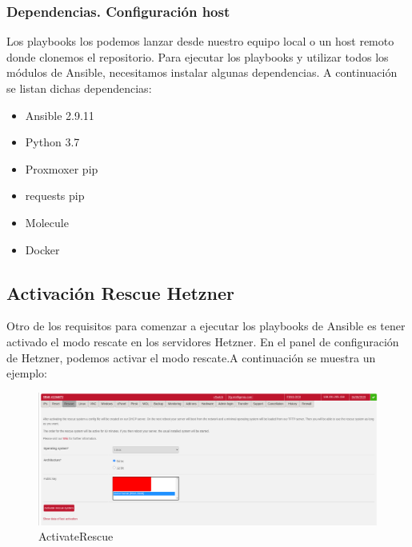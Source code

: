 			\subsubsection{Dependencias. Configuración host}
				\begin{paragraph}
					Los playbooks los podemos lanzar desde nuestro equipo local o un host remoto donde clonemos el repositorio. Para ejecutar los playbooks y utilizar todos los módulos de Ansible, necesitamos instalar algunas dependencias. A continuación se listan dichas dependencias:
					\begin{itemize}
						\item Ansible 2.9.11
						\item Python 3.7
						\item Proxmoxer pip
						\item requests pip 
						\item Molecule
						\item Docker
					\end{itemize}
				\end{paragraph}
			
			
		\subsection{Activación Rescue Hetzner}
			\begin{paragraph}
				Otro de los requisitos para comenzar a ejecutar los playbooks de Ansible es tener activado el modo rescate en los servidores Hetzner. En el panel de configuración de Hetzner, podemos activar el modo rescate.A continuación se muestra un ejemplo:
					\begin{figure}[!hbt]
						\centering
						\includegraphics[scale=0.27]{imagenes/Manual/activar_rescue.png}
						\caption[ActivateRescue]{ActivateRescue}
						\label{ActivateRescue}
					\end{figure}
			\end{paragraph}
